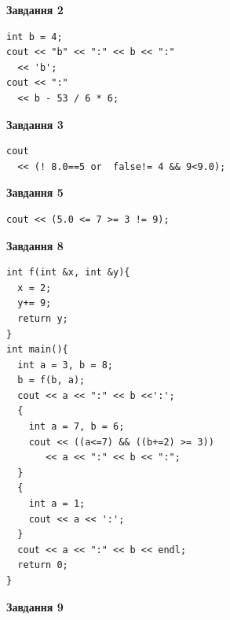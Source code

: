 \documentclass[12pt, ukrainian]{article}
\begin{document}
{\begin {large}
\begin{minipage}[t]{7.0cm}
\end{minipage}
\vline \hspace{1mm}
\begin{minipage}[t]{11.0cm}

\begin{center}
\textbf{Завдання 2}
\end{center}
\vspace{-8mm}

\begin{verbatim}
int b = 4;
cout << "b" << ":" << b << ":" 
  << 'b';
cout << ":" 
  << b - 53 / 6 * 6;
\end{verbatim}



\begin{center}
\textbf{Завдання 3}
\end{center}
\vspace{-8mm}

\begin{verbatim}
cout 
  << (! 8.0==5 or  false!= 4 && 9<9.0);
\end{verbatim}



\begin{center}
\textbf{Завдання 5}
\end{center}
\vspace{-8mm}

\begin{verbatim}
cout << (5.0 <= 7 >= 3 != 9);
\end{verbatim}



\begin{center}
\textbf{Завдання 8}
\end{center}
\vspace{-8mm}

\begin{verbatim}
int f(int &x, int &y){
  x = 2;
  y+= 9;
  return y;
}
int main(){
  int a = 3, b = 8;
  b = f(b, a);
  cout << a << ":" << b <<':';
  {
    int a = 7, b = 6;
    cout << ((a<=7) && ((b+=2) >= 3))
       << a << ":" << b << ":";
  }
  {
    int a = 1;
    cout << a << ':';
  }
  cout << a << ":" << b << endl;
  return 0;
}
\end{verbatim}

\end{minipage}


\begin{minipage}[t]{7.0cm}

\begin{center}
\textbf{Завдання 9}
\end{center}
\vspace{-8mm}


\end{minipage}
\end{large}}
\end{document}

